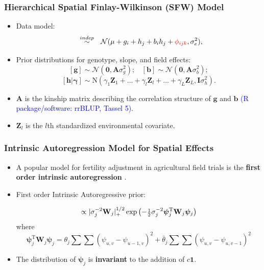\documentclass{beamer}
\newcommand{\bA}{\mathbf{A}}
\newcommand{\bphi}{{\bm\phi}}
\newcommand{\bpsi}{{\bm\psi}}
\newcommand{\bW}{\mathbf{W}}
\newcommand{\sT}{\mathrm{T}}
\newcommand{\bZ}{\mathbf{Z}}
\newcommand{\shalf}{\mbox{{\footnotesize$\frac{1}{2}$}}}
\newcommand{\red}[1]{\textcolor{red}{#1}}
\begin{document}
\begin{frame}
	\frametitle{Hierarchical Spatial Finlay-Wilkinson (SFW) Model}
	\begin{itemize}
	\item Data model:
\begin{equation*}
[y_{ijk} | \mu, \mathbf{g}, \mathbf{b}, \mathbf{h}, \red{\bphi} ] \ \ \overset{indep}{\sim} \ \  \mathcal{N}(\mu + g_i + h_j + b_i h_j + \red{\phi_{ijk}}, \sigma_e^2),
\end{equation*}

	\item Prior distributions for genotype, slope, and field effects:
	$$  [\mathbf{g}] \sim \mathcal{N}(\bm{0}, \bA \sigma_g^2); \ \ \ \ [\mathbf{b}] \sim \mathcal{N}(\bm{0}, \bA \sigma_b^2); $$
        $$[\mathbf{h}|\bm{\gamma}] \sim \mathrm{N}( \gamma_1 \bZ_1 + \dots + \gamma_l \bZ_l + \dots + \gamma_L \bZ_L
         , \mathbf{I} \sigma_h^2).$$
         \item $\bA$ is the kinship matrix describing the correlation structure of $\mathbf{g}$ and $\mathbf{b}$ \textcolor{blue}{(R package/software: rrBLUP, Tassel 5)}.
	\item $\bZ_{l}$ is the $l$th standardized environmental covariate.
	\end{itemize}
\end{frame}


\begin{frame}
	\frametitle{Intrinsic Autoregression Model for Spatial Effects}
	\begin{itemize}
	\item A popular model for fertility adjustment in agricultural field trials is the \textbf{first order intrinsic autoregression} \citep{besag1999bayesian,dutt:mond:2015}.

\item First order Intrinsic Autoregressive prior:

\begin{equation*}
[\bpsi_j|\theta_j,\sigma^2_j] \propto |\sigma^{-2}_j\bW_j|_+^{1/2}\exp\left( -\shalf\sigma^{-2}_j\bpsi_j^\sT \bW_j\bpsi_j\right)
\end{equation*}
where
\[\bpsi_j^\sT \bW_j\bpsi_j = \theta_j\sum\sum(\psi_{u,v} - \psi_{u-1,v})^2 + {\bar\theta}_j\sum\sum(\psi_{u,v} - \psi_{u,v-1})^2\]

\item  The distribution of $\pmb{\psi}_j$ is \textbf{invariant} to the addition of $c \bm{1}$.

	\end{itemize}

\end{frame}
\end{document}
